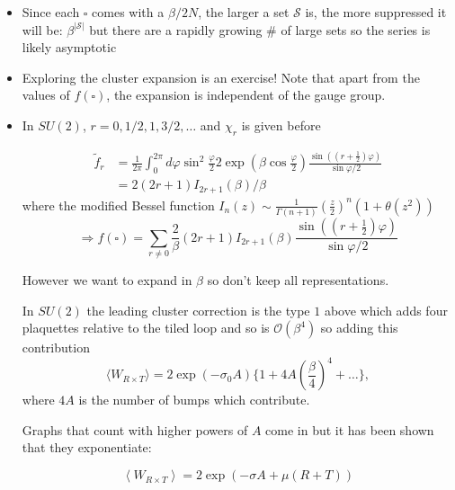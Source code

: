 \begin{itemize}
  \item Since each $\square$ comes with a $\beta/2N$, the larger a set $\mathcal{S}$ is, the more suppressed it will be: $\beta^{|\mathcal{S}|}$ but there are a rapidly growing $\#$ of large sets so the series is likely asymptotic
  \item Exploring the cluster expansion is an exercise! Note that apart from the values of $f(\square)$, the expansion is independent of the gauge group.
  
  \item In $SU(2)$, $r = 0,1/2, 1, 3/2, \ldots$ and $\chi_r$ is given before

\begin{equation}
\begin{aligned}
\tilde{f}_{r} & =\frac{1}{2 \pi} \int_{0}^{2 \pi} d \varphi \sin ^{2} \frac{\varphi}{2} 2 \exp \left(\beta \cos \frac{\varphi}{2}\right) \frac{\sin \left(\left(r+\frac{1}{2}\right) \varphi\right)}{\sin \varphi / 2} \\
& =2\left(2{r+1}\right) I_{2 r+1}(\beta) / \beta
\end{aligned}
\end{equation}
where the  modified Bessel function  $I_{n}(z) \sim \frac{1}{\Gamma(n+1)}\left(\frac{z}{2}\right)^{n}\left(1+\theta\left(z^{2}\right)\right)$
\begin{equation}
\Rightarrow f(\square)  =\sum_{r \neq 0} \frac{2}{\beta}(2 r+1) I_{2 r+1}(\beta) \frac{\sin \left(\left(r+\frac{1}{2}\right) \varphi\right)}{\sin \varphi / 2}
\end{equation}

However we want to expand in $\beta$ so don't keep all representations.

In $SU(2)$ the leading cluster correction is the type $1$ above which adds four plaquettes relative to the tiled loop and so is $\mathcal{O}(\beta^4)$ so adding this contribution
\begin{equation}
    \langle W_{R\times T} \rangle = 2 \exp(-\sigma_0 A) \{ 1 + 4 A \left(\frac{\beta}{4}\right)^4 + \ldots\},
\end{equation}
where $4A$ is the number of bumps which contribute.

Graphs that count with higher powers of $A$ come in but it has been shown that they exponentiate:

\begin{equation}
\left\langle W_{R \times T}\right\rangle=2 \exp (-\sigma A+\mu(R+T))
\end{equation}


\end{itemize}
